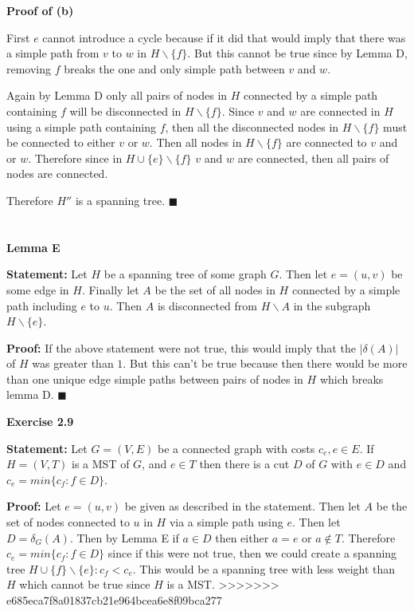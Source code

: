 \documentclass{article}
\newcommand*{\QEDA}{\hfill\ensuremath{\blacksquare}}%
\begin{document}
\textbf{Proof of (b)} 

First $e$ cannot introduce a cycle because if it did that would imply that there was a simple path from $v$ to $w$ in $H \backslash \{f\}$. But this cannot be true since by Lemma D, removing $f$ breaks the one and only simple path between $v$ and $w$. 

Again by Lemma D only all pairs of nodes in $H$ connected by a simple path containing $f$ will be disconnected in $H \backslash \{f\}$. Since $v$ and $w$ are connected in $H$ using a simple path containing $f$, then all the disconnected nodes in $H \backslash \{f\}$ must be connected to either $v$ or $w$. Then all nodes in $H \backslash \{f\}$ are connected to $v$ and or $w$. Therefore since in $H \cup \{e\} \backslash \{f\}$ $v$ and $w$ are connected, then all pairs of nodes are connected. 

Therefore $H''$ is a spanning tree.
\QEDA

\section{}
\textbf{Lemma E}

\textbf{Statement:} Let $H$ be a spanning tree of some graph $G$. Then let $e = (u,v)$ be some edge in $H$. Finally let $A$ be the set of all nodes in $H$ connected by a simple path including $e$  to $u$. Then $A$ is disconnected from $H \backslash A$ in the subgraph $H \backslash \{e\}$.

\textbf{Proof:} If the above statement were not true, this would imply that the $|\delta(A)|$ of $H$ was greater than $1$. But this can't be true because then there would be more than one unique edge simple paths between pairs of nodes in $H$ which breaks lemma D.
\QEDA

\textbf{Exercise 2.9}

\textbf{Statement:} Let $G = (V,E)$ be a connected graph with costs $c_e, e \in E$. If $H = (V,T)$ is a MST of $G$, and $e \in T$ then there is a cut $D$ of $G$ with $e \in D$ and $c_e = min\{c_f : f \in D\}$.

\textbf{Proof:} Let $e = (u,v)$ be given as described in the statement. Then let $A$ be the set of nodes connected to $u$ in $H$ via a simple path using $e$. Then let $D = \delta_G(A)$. Then by Lemma E if $a \in D$ then either $a = e$ or $a \notin T$. Therefore 
$c_e = min\{c_f : f \in D\}$ since if this were not true, then we could create a spanning tree $H \cup \{f\} \backslash \{e\} : c_f < c_e$. This would be a spanning tree with less weight than $H$ which cannot be true since $H$ is a MST.
>>>>>>> e685eca7f8a01837cb21e964bcea6e8f09bca277


 
\end{document}
